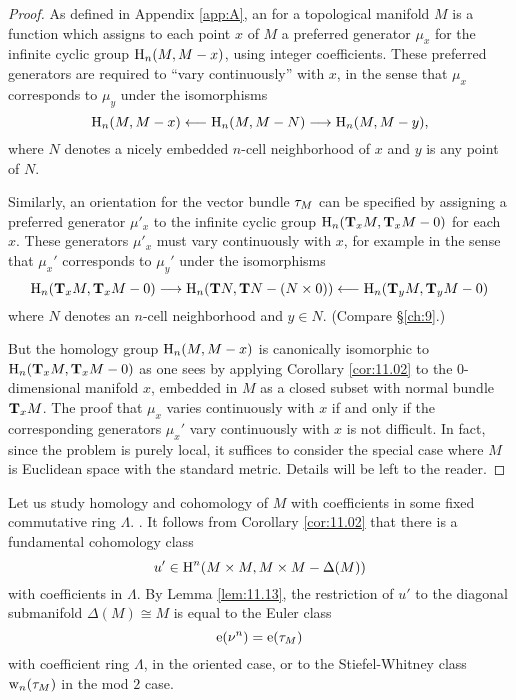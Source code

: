 \documentclass[../main]{subfiles}
\begin{document}
\begin{proof}
As defined in Appendix \ref{app:A}, an  for a topological manifold $M$ is a function which assigns to each point $x$ of $M$ a preferred generator $\mu_x$ for the infinite cyclic group $\homology_n(M, M - x)$, using integer coefficients. These preferred generators are required to ``vary continuously'' with $x$, in the sense that $\mu_x$ corresponds to $\mu_y$ under the isomorphisms \[\homology_n(M, M - x) \longleftarrow \homology_n(M, M - N) \longrightarrow \homology_n(M, M - y),\] where $N$ denotes a nicely embedded $n$-cell neighborhood of $x$ and $y$ is any point of $N$. 

Similarly, an orientation for the vector bundle $\tangentbundle M$ can be specified by assigning a preferred generator $\mu'_x$ to the infinite cyclic group $\homology_n(\tangentspace M x, \tangentspace M x - 0)$ for each $x$. These generators $\mu'_x$ must vary continuously with $x$, for example in the sense that $\mu_x'$ corresponds to $\mu_y'$ under the isomorphisms \[\homology_n(\tangentspace M x, \tangentspace M x - 0) \longrightarrow \homology_n(\tangentTS N, \tangentTS N - (N \times 0)) \longleftarrow \homology_n(\tangentspace M y, \tangentspace M y - 0)\] where $N$ denotes an $n$-cell neighborhood and $y \in N$. (Compare \S\ref{ch:9}.)

But the homology group $\homology_n(M, M - x)$ is canonically isomorphic to\newline $\homology_n(\tangentspace M x, \tangentspace M x - 0)$ as one sees by applying Corollary \ref{cor:11.02} to the $0$-dimensional manifold $x$, embedded in $M$ as a closed subset with normal bundle $\tangentspace M x$. The proof that $\mu_x$ varies continuously with $x$ if and only if the corresponding generators $\mu_x'$ vary continuously with $x$ is not difficult. In fact, since the problem is purely local, it suffices to consider the special case where $M$ is Euclidean space with the standard metric. Details will be left to the reader.
\end{proof}

Let us study homology and cohomology of $M$ with coefficients in some fixed commutative ring $\Lambda$. . It follows from Corollary \ref{cor:11.02} that there is a fundamental cohomology class \[u' \in \homology^n(M \times M, M \times M - \Delta(M))\] with coefficients in $\Lambda$. By Lemma \ref{lem:11.13}, the restriction of $u'$ to the diagonal submanifold $\Delta(M) \cong M$ is equal to the Euler class \[\eulerclass(\nu^n) = \eulerclass(\tangentbundle M)\] with coefficient ring $\Lambda$, in the oriented case, or to the Stiefel-Whitney class $\sw_n(\tangentbundle M)$ in the mod $2$ case.
\end{document}
